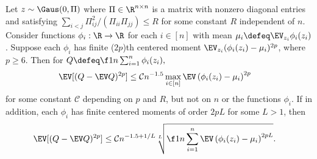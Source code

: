 \documentclass[main.tex]{subfiles}
\begin{document}
\begin{thm}\label{thm:controlHighMoments}
\newcommand{\LL}{2p}
\newcommand{\CC}{\mathcal{C}}
Let $z \sim \Gaus(0, \Pi)$ where $\Pi \in \R^{n \times n}$ is a matrix with nonzero diagonal entries and
satisfying $\sum_{i<j} \Pi_{ij}^2 / (\Pi_{ii} \Pi_{jj}) \le R$
for some constant $R$ independent of $n$.
Consider functions $\phi_i: \R \to \R$ for each $i \in [n]$ with mean $\mu_i \defeq \EV_{z_i} \phi_i(z_i)$.
Suppose each $\phi_i$ has finite ($\LL$)th centered moment $\EV_{z_i} (\phi_i(z_i) - \mu_i)^{\LL}$, where $p \ge 6$.
Then for $Q \defeq \f 1 n \sum_{i=1}^n \phi_i(z_i),$ %
\begin{align*}
    \EV[(Q - \EV Q)^{2p}]
        &\le
           \CC
            n^{-1.5} \max_{i \in [n]}
                \EV
                    \left(\phi_{i}(z_i) - \mu_i \right)^{2p}
\end{align*}
for some constant $\CC$ depending on $p$ and $R$, but not on $n$ or the functions $\phi_i$.
If in addition, each $\phi_i$ has finite centered moments of order $2p L$ for some $L > 1$, then
\begin{align*}
    \EV[(Q - \EV Q)^{2p}]
        &\le
           \CC
            n^{-1.5+1/L}
                \sqrt[L]{\f 1 n \sum_{i=1}^n 
                    \EV
                    \left(\phi_{i}(z_i) - \mu_i \right)^{2p L}
                    }
            .
\end{align*}
\end{thm}
\end{document}
